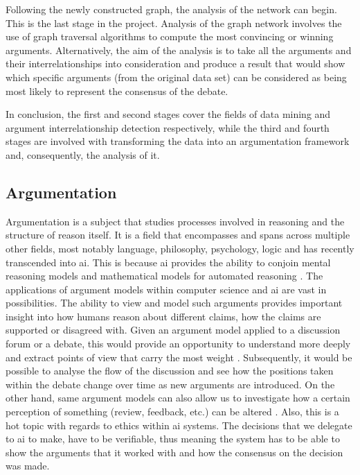      Following the newly constructed graph, the analysis of the network can begin. This is the last stage in the project. Analysis of the graph network involves the use of graph traversal algorithms to compute the most convincing or winning arguments. Alternatively, the aim of the analysis is to take all the arguments and their interrelationships into consideration and produce a result that would show which specific arguments (from the original data set) can be considered as being most likely to represent the consensus of the debate.
     
     In conclusion, the first and second stages cover the fields of data mining and argument interrelationship detection respectively, while the third and fourth stages are involved with transforming the data into an argumentation framework and, consequently, the analysis of it.

    \subsection{Argumentation} 
     Argumentation is a subject that studies processes involved in reasoning and the structure of reason itself. It is a field that encompasses and spans across multiple other fields, most notably language, philosophy, psychology, logic and has recently transcended into \gls{ai}. This is because \gls{ai} provides the ability to conjoin mental reasoning models and mathematical models for automated reasoning \autocite{Lippi2016ArgumentationMS}. The applications of argument models within computer science and \gls{ai} are vast in possibilities. The ability to view and model such arguments provides important insight into how humans reason about different claims, how the claims are supported or disagreed with. Given an argument model applied to a discussion forum or a debate, this would provide an opportunity to understand more deeply and extract points of view that carry the most weight \autocite{Cocarascu2017MiningBA}. Subsequently, it would be possible to analyse the flow of the discussion and see how the positions taken within the debate change over time as new arguments are introduced. On the other hand, same argument models can also allow us to investigate how a certain perception of something (review, feedback, etc.) can be altered \autocite{ApproxToTruth}. Also, this is a hot topic with regards to ethics within \gls{ai} systems. The decisions that we delegate to \gls{ai} to make, have to be verifiable, thus meaning the system has to be able to show the arguments that it worked with and how the consensus on the decision was made. 
     

